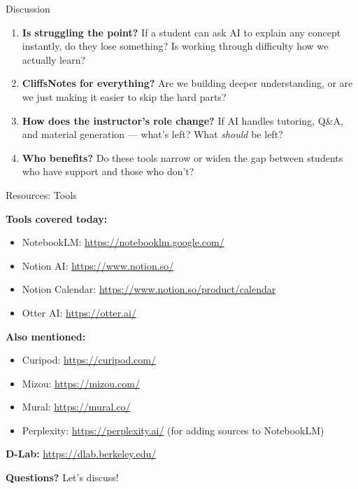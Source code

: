 \documentclass[aspectratio=169]{beamer}
\begin{document}

\begin{frame}{Discussion}
    \begin{enumerate}
        \item \textbf{Is struggling the point?} If a student can ask AI to explain any concept instantly, do they lose something? Is working through difficulty how we actually learn?

        \vspace{0.5em}
        \item \textbf{CliffsNotes for everything?} Are we building deeper understanding, or are we just making it easier to skip the hard parts?

        \vspace{0.5em}
        \item \textbf{How does the instructor's role change?} If AI handles tutoring, Q\&A, and material generation --- what's left? What \textit{should} be left?

        \vspace{0.5em}
        \item \textbf{Who benefits?} Do these tools narrow or widen the gap between students who have support and those who don't?
    \end{enumerate}
\end{frame}

\begin{frame}{Resources: Tools}
    {\small
    \textbf{Tools covered today:}
    \begin{itemize}
        \item NotebookLM: \url{https://notebooklm.google.com/}
        \item Notion AI: \url{https://www.notion.so/}
        \item Notion Calendar: \url{https://www.notion.so/product/calendar}
        \item Otter AI: \url{https://otter.ai/}
    \end{itemize}

    \vspace{0.5em}
    \textbf{Also mentioned:}
    \begin{itemize}
        \item Curipod: \url{https://curipod.com/}
        \item Mizou: \url{https://mizou.com/}
        \item Mural: \url{https://mural.co/}
        \item Perplexity: \url{https://perplexity.ai/} (for adding sources to NotebookLM)
    \end{itemize}

    \vspace{0.5em}
    \textbf{D-Lab:} \url{https://dlab.berkeley.edu/}

    \vspace{0.5em}
    \textbf{Questions?} Let's discuss!
    }
\end{frame}
\end{document}
